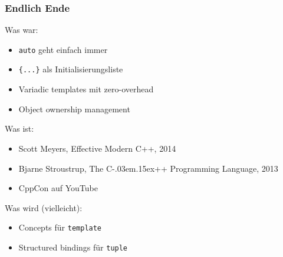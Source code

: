 \documentclass[t,ngerman,usepdftitle=false]{beamer}
\newcommand\Cpp{%
  C\kern-.03em\raise.15ex\hbox{++}%
  \spacefactor1000}
\begin{document}
\begin{frame}[fragile]
  \frametitle{Endlich Ende}
  
  Was war:
  \begin{itemize}
    \item \lstinline|auto| geht einfach immer
    \item \lstinline|{...}| als Initialisierungsliste
    \item Variadic templates mit zero-overhead
    \item Object ownership management
  \end{itemize}
  
  Was ist:
  \begin{itemize}
    \item Scott Meyers, Effective Modern C++, 2014
    \item Bjarne Stroustrup, The \Cpp{} Programming Language, 2013
    \item CppCon auf YouTube
  \end{itemize}
  
  Was wird (vielleicht):
  \begin{itemize}
    \item Concepts für \lstinline|template|
    \item Structured bindings für \lstinline|tuple|
  \end{itemize}
  
\end{frame}
\end{document}
